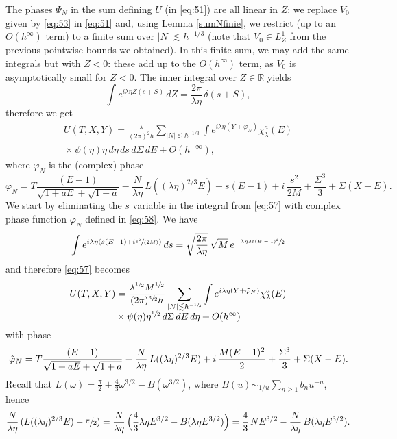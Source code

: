 \documentclass[11pt]{article}
\newcommand{\spfrac}[2]{\sfrac{#1}{(#2)}}
\newcommand\R{{\mathbb R}}
\theoremstyle{plain}
\theoremstyle{definition}
\begin{document}
The phases $\Psi_N$ in the sum defining $U$ (in \eqref{eq:51}) are all linear in ${Z}$: we replace $V_0$ given by \eqref{eq:53} in \eqref{eq:51} and, using Lemma \ref{sumNfinie}, we restrict (up to an $O(h^{\infty})$ term) to a finite sum over $|N|\lesssim h^{-1/3}$ (note that $V_{0}\in L^{1}_{Z}$ from the previous pointwise bounds we obtained). In this finite sum, we may add the same integrals but with $Z<0$: these add up to the $O(h^{\infty})$ term, as $V_{0}$ is asymptotically small for $Z<0$. The inner integral over ${Z}\in \R$ yields
\[
\int e^{i\lambda \eta {Z}(s+S)}\,dZ= \frac{2\pi}{\lambda \eta}\, \delta(s+S),
\]
therefore we get
\begin{multline}
\label{eq:57}
U(T,X,Y)
=\frac{\lambda}{(2\pi)^{2}h} \sum_{|N|\lesssim h^{-1/3}} \int e^{i\lambda \eta(Y+\varphi_{N})} \chi_{\lambda}^{a}(E)\\[-5pt]
{}\times\psi(\eta) \eta \,d\eta \,ds \,d\Sigma \,dE+O({h^{-\infty}}),
\end{multline}
where $\varphi_{N}$ is the (complex) phase
\begin{equation}
\label{eq:58}
\varphi_{N}= T \frac{(E-1)}{ \sqrt{1+aE}+\sqrt{1+a}} - \frac N {\lambda \eta}\, L((\lambda \eta)^{2/3} E)+s (E-1) + i\, \frac {s^{2}}{2M} +\frac{\Sigma^{3}} 3+ \Sigma (X-E).
\end{equation}
We start by eliminating the $s$ variable in the integral from \eqref{eq:57} with complex phase function $\varphi_N$ defined in \eqref{eq:58}. We have
\begin{equation*}
\label{eq:61}
\int e^{i\lambda \eta (s(E-1)+i\spfrac {s^{2}}{2M})}
\,ds= \sqrt{\frac{2\pi}{\lambda\eta}}\, \sqrt M\, e^{-\sfrac{\lambda\eta M(E-1)^{2}}{2}}
\end{equation*}
and therefore \eqref{eq:57} becomes
\begin{multline}
\label{eq:62}
U(T,X,Y)=\frac{\lambda^{\sfrac 12}M^{\sfrac 12}}{ (2\pi)^{\sfrac 32}h}\sum_{|N|\lesssim h^{-\sfrac 13}}\int e^{i\lambda \eta(Y+\tilde\varphi_{N})} \chi_{\lambda}^{a }(E)\\[-5pt]
{}\times\psi(\eta)\eta^{\sfrac 12} \,d\Sigma \,dE \,d\eta+O(h^{\infty})
\end{multline}
with phase
\begin{equation}
\label{eq:63}
\tilde\varphi_{N} = T \frac{(E-1)}{ \sqrt{1+aE}+\sqrt{1+a}} - \frac N {\lambda \eta}\, L((\lambda \eta)^{2/3} E)\\{}+ i\, \frac {M(E-1)^{2}}{2} +\frac{\Sigma^{3}} 3+ \Sigma (X-E).
\end{equation}
Recall that $L(\omega)=\frac\pi 2 + \frac 43 \omega^{3/2}-B(\omega^{3/2})$, where $B(u)\sim_{1/u}\sum_{n\geq 1} b_{n}u^{-n}$, hence
\[
\frac N {\lambda \eta}\, (L((\lambda \eta)^{2/3} E)-\sfrac \pi 2)=\frac N {\lambda \eta}\, \Bigl(\frac 43 \lambda\eta E^{3/2}-B(\lambda\eta E^{3/2})\Bigr)=\frac 43\, NE^{3/2}-\frac N {\lambda \eta}\,B(\lambda\eta E^{3/2}).
\]
\end{document}
